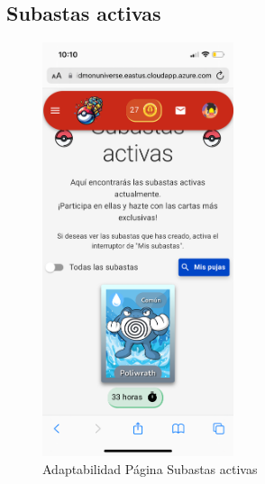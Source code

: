 \subsection*{Subastas activas}
\begin{figure}[H]
    \centering
    \includegraphics[width=0.5\textwidth]{figures/adaptabilidad/subastas.png}
    \caption{Adaptabilidad Página Subastas activas}
    \label{fig:Adap-Subastas}
\end{figure}


